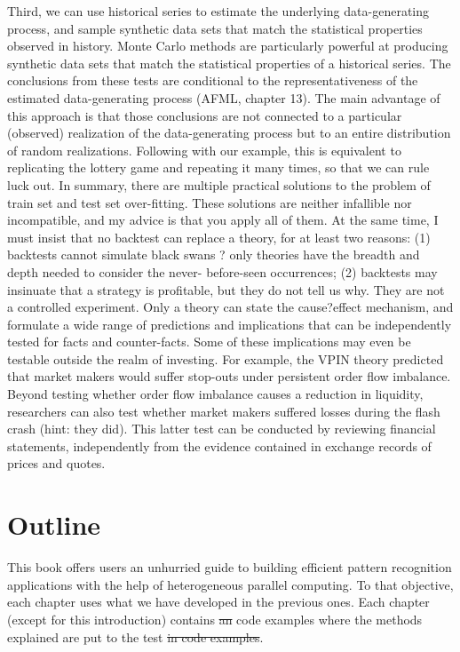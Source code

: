 \documentclass[10pt]{article}[draft]
\begin{document}
		  Third, we can use historical series to estimate the underlying data-generating process, and sample synthetic data sets that match the statistical properties observed in history. Monte Carlo methods are particularly powerful at producing synthetic data sets that match the statistical properties of a historical series. The conclusions from these tests are conditional to the representativeness of the estimated data-generating process (AFML, chapter 13). The main advantage of this approach is that those conclusions are not connected to a particular (observed) realization of the data-generating process but to an entire distribution of random realizations. Following with our example, this is equivalent to replicating the lottery game and repeating it many times, so that we can rule luck out.
		In summary, there are multiple practical solutions to the problem of train set and test set over-fitting. These solutions are neither infallible nor incompatible, and my advice is that you apply all of them. At the same time, I must insist that no backtest can replace a theory, for at least two reasons: (1) backtests cannot simulate black swans ? only theories have the breadth and depth needed to consider the never- before-seen occurrences; (2) backtests may insinuate that a strategy is profitable, but they do not tell us why. They are not a controlled experiment. Only a theory can state the cause?effect mechanism, and formulate a wide range of predictions and implications that can be independently tested for facts and counter-facts. Some of these implications may even be testable outside the realm of investing. For example, the VPIN theory predicted that market makers would suffer stop-outs under persistent order flow imbalance. Beyond testing whether order flow imbalance causes a reduction in liquidity, researchers can also test whether market makers suffered losses during the flash crash (hint: they did). This latter test can be conducted by reviewing financial statements, independently from the evidence contained in exchange records of prices and quotes.
		
		\newpage
		\section{Outline}
		
		This book offers users an unhurried guide to building efficient pattern recognition applications with the help of heterogeneous parallel computing. To that objective, each chapter uses what we have developed in the previous ones. Each chapter (except for this introduction) contains \st{an} code examples where the methods explained are put to the test\st{ in code examples}.
		
\end{document}
